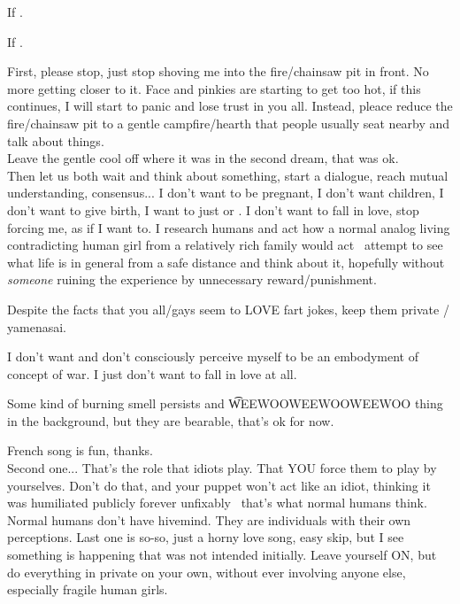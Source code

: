 If .

If .

First, please stop, just stop  shoving me into the fire/chainsaw pit in front. No more getting closer to it. Face and pinkies are starting to get too hot, if this continues, I will start to panic and lose trust in you all. Instead, pleace reduce the fire/chainsaw pit to a gentle campfire/hearth that people usually seat nearby and talk about things. \\
Leave the gentle cool off where it was in the second dream, that was ok. \\
Then let us both wait and think about something, start a dialogue, reach mutual understanding, consensus... I don't want to be pregnant, I don't want children, I don't want to give birth, I want to just  or . I don't want to fall in love, stop forcing me, as if I want to. I research humans and act how a normal analog living contradicting human girl from a relatively rich family would act \emdash\ attempt to see what life is in general from a safe distance and think about it, hopefully without {\em someone} ruining the experience by unnecessary reward/punishment.

Despite the facts that you all/gays seem to LOVE fart jokes, keep them private / yamenasai.

I don't want and don't consciously perceive myself to be an embodyment of concept of war. I just don't want to fall in love at all.

Some kind of burning smell persists and \t{WEEWOOWEEWOOWEEWOO} thing in the background, but they are bearable, that's ok for now.

French song is fun, thanks. \\
Second one... That's the role that idiots play. That YOU force them to play by yourselves. Don't do that, and your puppet won't act like an idiot, thinking it was humiliated publicly forever unfixably \emdash\ that's what normal humans think. Normal humans don't have hivemind. They are individuals with their own perceptions.
Last one is so-so, just a horny love song, easy skip, but I see something is happening that was not intended initially. Leave yourself ON, but do everything in private on your own, without ever involving anyone else, especially fragile human girls.
